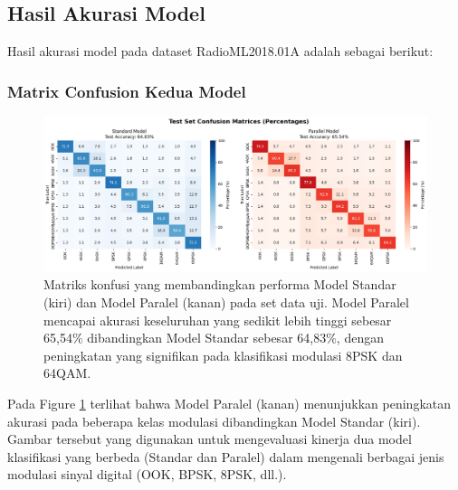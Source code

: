 \documentclass{article}
\begin{document}
\subsection{Hasil Akurasi Model}
Hasil akurasi model pada dataset RadioML2018.01A adalah sebagai berikut:
\subsubsection{Matrix Confusion Kedua Model}
\begin{figure}[ht]
    \centerline{\includegraphics[width=1.0\textwidth,height=0.4\textheight]{Hasil/confusion_matrix_with_percentage.png}}
    \caption{Matriks konfusi yang membandingkan performa Model Standar (kiri) dan Model Paralel (kanan) pada set data uji. Model Paralel mencapai akurasi keseluruhan yang sedikit lebih tinggi sebesar 65,54\% dibandingkan Model Standar sebesar 64,83\%, dengan peningkatan yang signifikan pada klasifikasi modulasi 8PSK dan 64QAM.}
    \label{fig:Figure 1}
\end{figure}

Pada Figure \ref{fig:Figure 1} terlihat bahwa Model Paralel (kanan) menunjukkan peningkatan akurasi pada beberapa kelas modulasi 
dibandingkan Model Standar (kiri). Gambar tersebut yang digunakan untuk mengevaluasi kinerja dua model klasifikasi yang berbeda 
(Standar dan Paralel) dalam mengenali berbagai jenis modulasi sinyal digital (OOK, BPSK, 8PSK, dll.).
\end{document}
